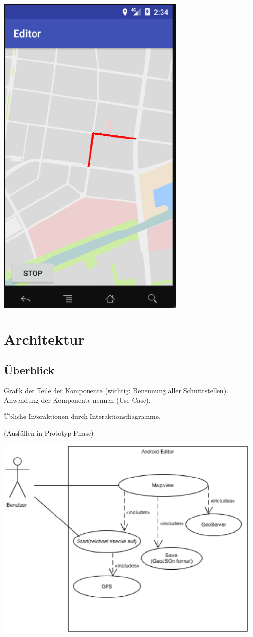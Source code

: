 \includegraphics[width=0.7\textwidth]{AndroidEditorOV}

\section{Architektur}

\subsection{Überblick}
Grafik der Teile der Komponente (wichtig: Benennung aller Schnittstellen). 
Anwendung der Komponente nennen (Use Case).

Übliche Interaktionen durch Interaktionsdiagramme.

(Ausfüllen in Prototyp-Phase)

\includegraphics[width=1.0\textwidth]{UseCase}

